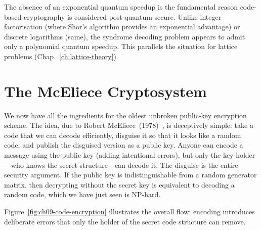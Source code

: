The absence of an exponential quantum speedup is the fundamental reason code-based cryptography is considered post-quantum secure.  Unlike integer factorisation (where Shor's algorithm provides an exponential advantage) or discrete logarithms (same), the syndrome decoding problem appears to admit only a polynomial quantum speedup.  This parallels the situation for lattice problems (Chap.~\ref{ch:lattice-theory}).


\section{The McEliece Cryptosystem}
\label{sec:mceliece}

We now have all the ingredients for the oldest unbroken public-key encryption scheme.  The idea, due to Robert McEliece~(1978)~\cite{McEliece1978}, is deceptively simple: take a code that we can decode efficiently, disguise it so that it looks like a random code, and publish the disguised version as a public key.  Anyone can encode a message using the public key (adding intentional errors), but only the key holder---who knows the secret structure---can decode it.  The disguise is the entire security argument.  If the public key is indistinguishable from a random generator matrix, then decrypting without the secret key is equivalent to decoding a random code, which we have just seen is NP-hard.

Figure~\ref{fig:ch09-code-encryption} illustrates the overall flow: encoding introduces deliberate errors that only the holder of the secret code structure can remove.

